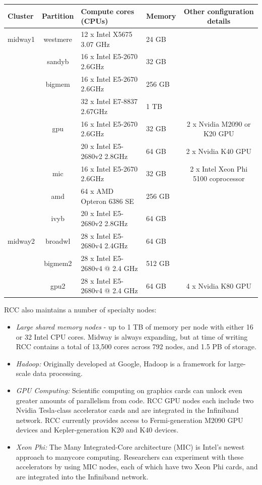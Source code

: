 \documentclass[onecolumn, compsoc,12pt]{IEEEtran}
\begin{document}
\begin{table}[!ht]
\label{tabcap}
\setlength{\arrayrulewidth}{1pt}
\bf\sffamily\fontsize{9}{10}\selectfont
\begin{tabular}{||C{.8in}|c|R{1.85in}|R{.5in}|c||}\hline
{}Cluster	&Partition&	Compute cores (CPUs)&	Memory	&Other configuration details\\\hline
midway1	&westmere&	12 x Intel X5675 3.07 GHz&	24 GB	& \\\hline
 	&sandyb	&16 x Intel E5-2670 2.6GHz&	32 GB	& \\\hline
 &	bigmem&	16 x Intel E5-2670 2.6GHz&	256 GB	& \\\hline
 	& &	32 x Intel E7-8837 2.67GHz&	1 TB&	 \\\hline
 	&gpu&	16 x Intel E5-2670 2.6GHz&	32 GB&	2 x Nvidia M2090 or K20 GPU\\\hline
 &	 &	20 x Intel E5-2680v2 2.8GHz&	64 GB&	2 x Nvidia K40 GPU\\\hline
 &	mic&	16 x Intel E5-2670 2.6GHz&	32 GB&	2 x Intel Xeon Phi 5100 coprocessor\\\hline
 &	amd&	64 x AMD Opteron 6386 SE&	256 GB&	 \\\hline
 &	ivyb&	20 x Intel E5-2680v2 2.8GHz&	64 GB&	 \\\hline
midway2&	broadwl&	28 x Intel E5-2680v4 2.4GHz&	64 GB&	 \\\hline
 &	bigmem2&	28 x Intel E5-2680v4 @ 2.4 GHz&	512 GB	 &\\\hline
 	&gpu2&	28 x Intel E5-2680v4 @ 2.4 GHz&	64 GB&	4 x Nvidia K80 GPU\\\hline
\end{tabular}
\end{table}


RCC also maintains a number of specialty nodes: 
\begin{itemize}
\item \textit{\color{gray} Large shared memory nodes} - up to 1 TB of memory per node with either 16 or 32 Intel CPU cores. Midway is always expanding, but at time of writing RCC contains a total of 13,500 cores across 792 nodes, and 1.5 PB of storage.
\item  \textit{\color{gray}  Hadoop:} Originally developed at Google, Hadoop is a framework for large-scale data processing.   \item  \textit{\color{gray}  GPU Computing:} Scientific computing on graphics cards can unlock even greater amounts of parallelism from code. RCC GPU nodes each include two Nvidia Tesla-class accelerator cards and are integrated in the Infiniband network. RCC currently provides access to Fermi-generation M2090 GPU devices and Kepler-generation K20 and K40 devices.  \item  \textit{\color{gray}  Xeon Phi:} The Many Integrated-Core architecture (MIC) is Intel's newest approach to manycore computing. Researchers can experiment with these accelerators by using  MIC nodes, each of which have two Xeon Phi cards, and are integrated into the Infiniband network.
\end{itemize}
\end{document}
